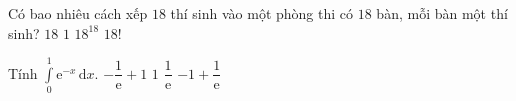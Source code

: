 \begin{ex}%
	Có bao nhiêu cách xếp $18$ thí sinh vào một phòng thi có $18$ bàn, mỗi bàn một thí sinh?
	\choice
	{$18$}
	{$1$}
	{$18^{18}$}
	{\True $18!$}
\end{ex}
\begin{ex}%
	Tính $\displaystyle \int\limits_{0}^{1} \mathrm{e}^{-x} \mathrm{\,d}x$.
	\choice
	{\True $-\dfrac{1}{\mathrm{e}}+1$}
	{$1$}
	{$\dfrac{1}{\mathrm{e}}$}
	{$-1+\dfrac{1}{\mathrm{e}}$}
\end{ex}
